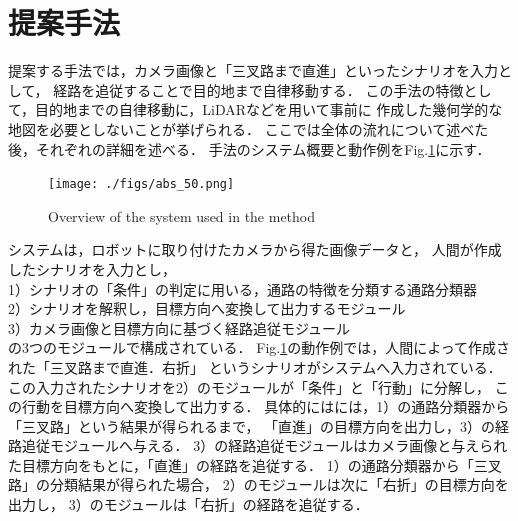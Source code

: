 \documentclass{sice-si}
\begin{document}
\section{提案手法}
提案する手法では，カメラ画像と「三叉路まで直進」といったシナリオを入力として，
経路を追従することで目的地まで自律移動する．
この手法の特徴として，目的地までの自律移動に，LiDARなどを用いて事前に
作成した幾何学的な地図を必要としないことが挙げられる．
ここでは全体の流れについて述べた後，それぞれの詳細を述べる．
手法のシステム概要と動作例をFig.\ref{fig:system}に示す．
\begin{figure}[htbp]
    \centering
     \texttt{[image: ./figs/abs\_50.png]}
     \caption{Overview of the system used in the method}\label{fig:system}
\end{figure}
\par
システムは，ロボットに取り付けたカメラから得た画像データと，
人間が作成したシナリオを入力とし，\\
1）シナリオの「条件」の判定に用いる，通路の特徴を分類する通路分類器\\
2）シナリオを解釈し，目標方向へ変換して出力するモジュール\\
3）カメラ画像と目標方向に基づく経路追従モジュール\\
の3つのモジュールで構成されている．
Fig.\ref{fig:system}の動作例では，人間によって作成された「三叉路まで直進．右折」
というシナリオがシステムへ入力されている．
この入力されたシナリオを2）のモジュールが「条件」と「行動」に分解し，
この行動を目標方向へ変換して出力する．
具体的にはには，1）の通路分類器から「三叉路」という結果が得られるまで，
「直進」の目標方向を出力し，3）の経路追従モジュールへ与える．
3）の経路追従モジュールはカメラ画像と与えられた目標方向をもとに，「直進」の経路を追従する．
1）の通路分類器から「三叉路」の分類結果が得られた場合，
2）のモジュールは次に「右折」の目標方向を出力し，
3）のモジュールは「右折」の経路を追従する．

\end{document}

